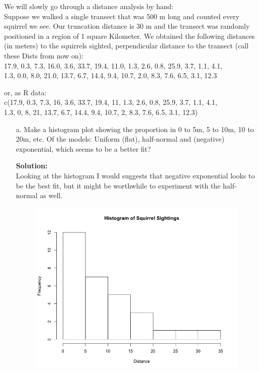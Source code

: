 \documentclass[12pt]{article}
\makeatletter
\theoremstyle{homework}
\newenvironment{exercise}[1]
{\def\@currentlabel{#1}\exercisecore}
{\endexercisecore}
\newcommand{\localhead}[1]{\par\smallskip\noindent\textbf{#1}\nobreak\\}%
\newcommand\solution{\localhead{Solution:}}
\makeatother
\begin{document}
\begin{exercise}{1} We will slowly go through a distance analysis by hand:\\
  Suppose we walked a single transect that was 500 m long and counted every squirrel we see. Our truncation distance is 30 m and the transect was randomly positioned in a region of 1 square Kilometer.
  We obtained the following distances (in meters) to the squirrels sighted, perpendicular distance to the transect (call these Dists from now on):\\
  17.9, 0.3, 7.3, 16.0, 3.6, 33.7, 19.4, 11.0, 1.3, 2.6, 0.8, 25.9, 3.7, 1.1, 4.1, \\
  1.3, 0.0, 8.0, 21.0, 13.7, 6.7, 14.4, 9.4, 10.7, 2.0, 8.3, 7.6, 6.5, 3.1, 12.3

  or, as R data:\\
  c(17.9, 0.3, 7.3, 16, 3.6, 33.7, 19.4, 11, 1.3, 2.6, 0.8, 25.9, 3.7, 1.1, 4.1,\\
  1.3, 0, 8, 21, 13.7, 6.7, 14.4, 9.4, 10.7, 2, 8.3, 7.6, 6.5, 3.1, 12.3)
  
  \begin{enumerate}
    \item[a.] Make a histogram plot showing the proportion in 0 to 5m, 5 to 10m, 10 to 20m, etc. Of the models: Uniform (flat), half-normal and (negative) exponential, which seems to be a better fit?\\
    \solution Looking at the histogram I would suggests that negative exponential looks to be the best fit, but it might be worthwhile to experiment with the half-normal as well.
    \begin{figure}[H]
      \begin{center}
      \includegraphics[width = .9\textwidth]{Rplot.png}
      \end{center}
    \end{figure}  


\end{enumerate}
\end{exercise}
\end{document}
